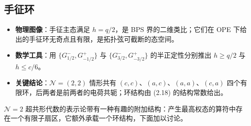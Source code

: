 \subsection{手征环}
\label{sec:2.2}

\begin{keytakeaways}
  \begin{itemize}[leftmargin=1.4em,itemsep=2pt,topsep=2pt]
    \item \textbf{物理图像}：手征主态满足 $h=q/2$，是 BPS 界的二维类比；它们在 OPE 下给出的手征环无奇点且有限，是拓扑弦可截断的态空间。
    \item \textbf{数学工具}：用 $\{G^{-}_{1/2},G^{+}_{-1/2}\}$ 与 $\{G^{-}_{3/2},G^{+}_{-3/2}\}$ 的半正定性分别推出 $h\ge q/2$ 与 $h\le c/6$。
    \item \textbf{关键结论}：$\mathcal{N}=(2,2)$ 情形共有 $(c,c)$、$(a,c)$、$(a,a)$、$(c,a)$ 四个有限环，后两者是前两者的电荷共轭；环结构由 (2.18) 的结构常数给出。
  \end{itemize}
\end{keytakeaways}

$\mathcal{N}=2$ 超共形代数的表示论带有一种有趣的附加结构：产生最高权态的算符中存在一个有限子扇区，它额外承载一个环结构，下面加以讨论。

